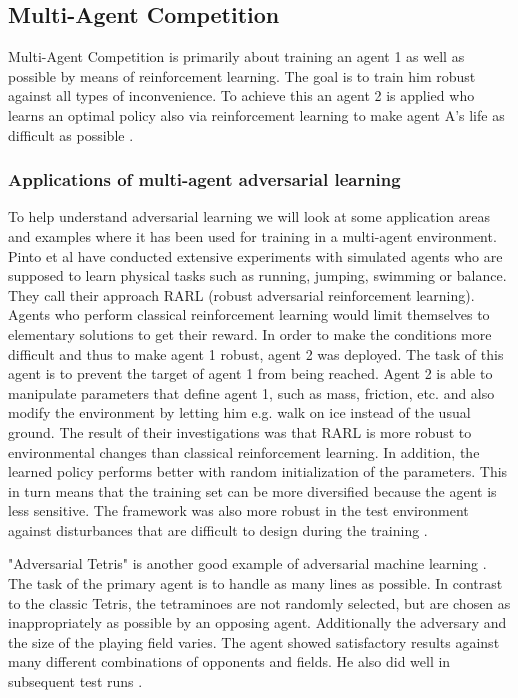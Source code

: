 \subsection{Multi-Agent Competition}
\label{multiagent}
Multi-Agent Competition is primarily about training an agent 1 as well as possible by means of reinforcement learning. The goal is to train him robust against all types of inconvenience.
To achieve this an agent 2 is applied who learns an optimal policy also via reinforcement learning to make agent A's life as difficult as possible \cite{robustPinto2017Mar}.

\subsubsection{Applications of multi-agent adversarial learning}

To help understand adversarial learning we will look at some application areas and examples where it has been used for training in a multi-agent environment.\\

Pinto et al \cite{robustPinto2017Mar} have conducted extensive experiments with simulated agents who are supposed to learn physical tasks such as running, jumping, swimming or balance. They call their approach RARL (robust adversarial reinforcement learning). Agents who perform classical reinforcement learning would limit themselves to elementary solutions to get their reward. In order to make the conditions more difficult and thus to make agent 1 robust, agent 2 was deployed. The task of this agent is to prevent the target of agent 1 from being reached. Agent 2 is able to manipulate parameters that define agent 1, such as mass, friction, etc. and also modify the environment by letting him e.g. walk on ice instead of the usual ground.
The result of their investigations was that RARL is more robust to environmental changes than classical reinforcement learning. In addition, the learned policy performs better with random initialization of the parameters. This in turn means that the training set can be more diversified because the agent is less sensitive. The framework was also more robust in the test environment against disturbances that are difficult to design during the training \cite{robustPinto2017Mar}.

"Adversarial Tetris" is another good example of adversarial machine learning \cite{tetrisRovatsou2010May}. The task of the primary agent is to handle as many lines as possible. In contrast to the classic Tetris, the tetraminoes are not randomly selected, but are chosen as inappropriately as possible by an opposing agent. Additionally the adversary and the size of the playing field varies. 
The agent showed satisfactory results against many different combinations of opponents and fields. He also did well in subsequent test runs \cite{tetrisRovatsou2010May}.

